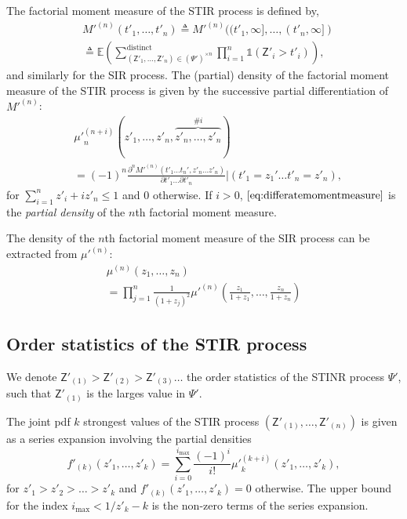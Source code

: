 \documentclass[lettersize,journal]{IEEEtran}
\begin{document}
 The factorial moment measure of the STIR process is defined by,
    \begin{align}
          &M'^{(n)}(t'_1,\dots,t'_n) \triangleq M'^{(n)}((t'_1,\infty],\dots,(t'_n,\infty]) \nonumber \\
              &\triangleq \mathbb{E} \left( \sum^{\text{distinct}}_{\left(\mathsf{Z}'_1, \dots, \mathsf{Z}'_n \right) \in (\Psi')^{\times n}} \prod_{i=1}^n \mathds{1}(\mathsf{Z}'_i >t'_i)\right),
    \end{align}
    and similarly for the SIR process.
 The (partial) density of the factorial moment measure of the STIR process is given by the successive partial differentiation of $M'^{(n)}$:
    \begin{align}
      \label{eq:differatemomentmeasure}
     &{\mu'}_n^{(n+i)}(z'_1,\dots,z'_n,\overbrace{z'_n,\dots,z'_n}^{\#i}) \nonumber \\&= (-1)^n \frac{\partial^n M'^{(n)}(t'_1\dots t_n',z'_n \dots z'_n) }{\partial t'_1 \dots \partial t'_n} |(t'_1=z_1'\dots t'_n=z'_n),
    \end{align}
    for $\sum_{i=1}^n z'_i + i z'_n\leq 1$ and $0$ otherwise.  If $i >0$, $\eqref{eq:differatemomentmeasure}$ is the \textit{partial density} of the $n$th factorial moment measure.

    The density of the $n$th factorial moment measure of the SIR process can be extracted from $\mu'^{(n)}$:
    \begin{align}
      \label{eq:densitySINR}
      &\mu^{(n)}(z_1,\dots,z_n)&\\
      &= \prod_{j=1}^n\frac{1}{(1+z_j)^2}\mu'^{(n)}\left(\frac{z_1}{1+z_1},\dots,\frac{z_n}{1+z_n}\right)
    \end{align}

    
  
\subsection{Order statistics of the STIR process}
We denote $\mathsf{Z}'_{(1)}>\mathsf{Z}'_{(2)} >\mathsf{Z}'_{(3)} \dots$ the order statistics of the STINR process $\Psi'$, such that $\mathsf{Z}'_{(1)}$ is the larges value in $\Psi'$.


The joint pdf $k$ strongest values of the STIR process $(\mathsf{Z}'_{(1)}, \dots, \mathsf{Z}'_{(n)})$ is given as a series expansion involving the partial densities
\begin{equation}
  \label{eq:jointprobability}
  f'_{(k)}(z'_1,\dots,z'_k)= \sum^{i_{\text{max}}}_{i=0}\frac{(-1)^i}{i!}{\mu'}_k^{(k+i)}(z'_1,\dots,z'_k),
\end{equation}
for $z'_1>z'_2>\dots>z'_k$ and $f'_{(k)}(z'_1,\dots,z'_k) =0 $ otherwise. The upper bound for the index $i_{\text{max}}<1/z'_k-k$ is the non-zero terms of the series expansion. 
\end{document}
